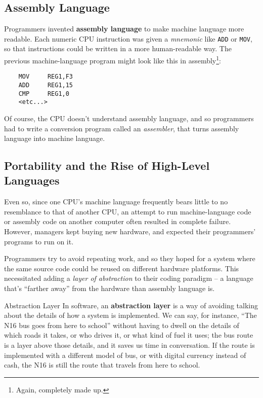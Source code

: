 \subsection{Assembly Language}

Programmers invented \textbf{assembly language} to make machine language more readable.  Each numeric CPU instruction was given a \textit{mnemonic} like \verb-ADD- or \verb-MOV-, so that instructions could be written in a more human-readable way.  The previous machine-language program might look like this in assembly\footnote{Again, completely made up.}:

\begin{minipage}{\textwidth}
\begin{verbatim}
    MOV     REG1,F3
    ADD     REG1,15
    CMP     REG1,0
    <etc...>
\end{verbatim}
\end{minipage}

Of course, the CPU doesn't understand assembly language, and so programmers had to write a conversion program called an \textit{assembler}, that turns assembly language into machine language.

\subsection{Portability and the Rise of High-Level Languages}

Even so, since one CPU's machine language frequently bears little to no resemblance to that of another CPU, an attempt to run machine-language code or assembly code on another computer often resulted in complete failure.  However, managers kept buying new hardware, and expected their programmers' programs to run on it.

Programmers try to avoid repeating work, and so they hoped for a system where the same source code could be reused on different hardware platforms.  This necessitated adding a \textit{layer of abstraction} to their coding paradigm -- a language that's ``farther away'' from the hardware than assembly language is.

\begin{defn}{Abstraction Layer}
    In software, an \textbf{abstraction layer} is a way of avoiding talking about the details of how a system is implemented.  We can say, for instance, ``The N16 bus goes from here to school'' without having to dwell on the details of which roads it takes, or who drives it, or what kind of fuel it uses; the bus route is a layer above those details, and it saves us time in conversation.  If the route is implemented with a different model of bus, or with digital currency instead of cash, the N16 is still the route that travels from here to school.
\end{defn}

